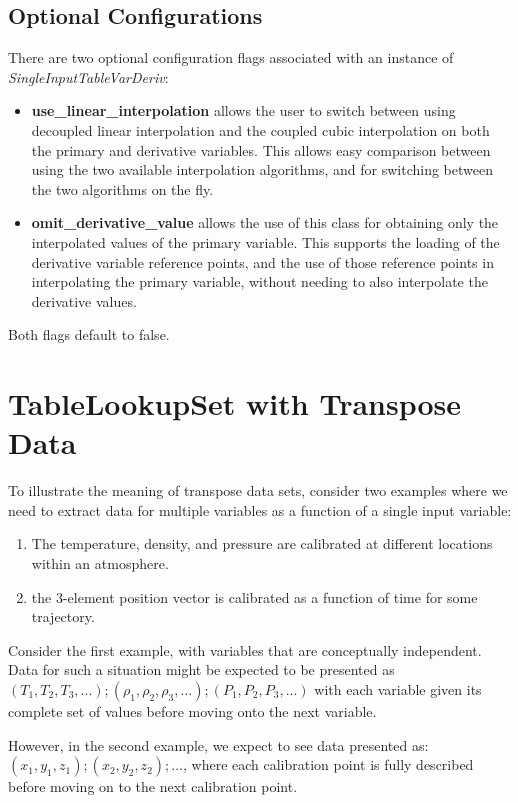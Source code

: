 \documentclass[11pt,fleqn]{report}
\begin{document}
\subsection{Optional Configurations}
There are two optional configuration flags associated with an instance of
\textit{SingleInputTableVarDeriv}:
\begin{itemize}
  \item \textbf{use\_linear\_interpolation} allows the user to switch between
  using decoupled linear interpolation and the coupled cubic interpolation on
  both the primary and derivative variables. This allows easy comparison
  between using the two available interpolation algorithms, and for switching
  between the two algorithms on the fly.
  \item \textbf{omit\_derivative\_value} allows the use of this class for
  obtaining only the interpolated values of the primary variable. This supports
  the loading of the derivative variable reference points, and the use of those
  reference points in interpolating the primary variable, without needing to
  also interpolate the derivative values.
\end{itemize}
Both flags default to false.


\section{TableLookupSet with Transpose Data}\label{sec:UG_transpose}

To illustrate the meaning of transpose data sets, consider two examples
where we need to extract data for multiple variables as a function of a
single input variable:
\begin{enumerate}
  \item The temperature, density, and pressure are calibrated at different
  locations within an atmosphere.
  \item the 3-element position vector is calibrated as a function of time
  for some trajectory.
\end{enumerate}

Consider the first example, with variables that are conceptually
independent.  Data for such a situation might be expected to be presented as
${(T_1, T_2, T_3, ...); (\rho_1, \rho_2, \rho_3, ...); (P_1, P_2, P_3, ...)}$
with each variable given its complete set of values before moving onto the
next variable.

However, in the second example, we expect to see data presented as:
${(x_1, y_1, z_1); (x_2, y_2, z_2); ...}$, where each calibration point is
fully described before moving on to the next calibration point.
\end{document}
